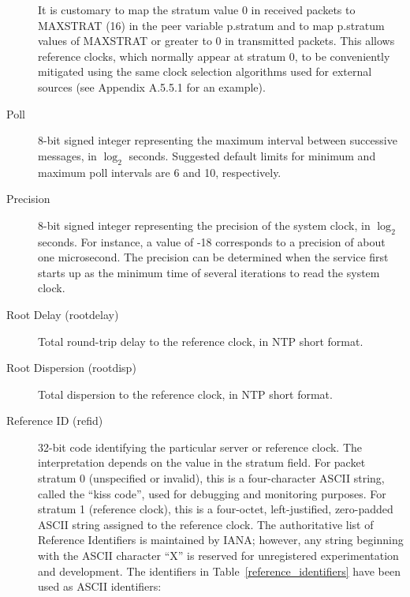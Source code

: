 \begin{description}
It is customary to map the stratum value 0 in received packets to
MAXSTRAT (16) in the peer variable p.stratum and to map p.stratum
values of MAXSTRAT or greater to 0 in transmitted packets. This
allows reference clocks, which normally appear at stratum 0, to be
conveniently mitigated using the same clock selection algorithms used
for external sources (see Appendix A.5.5.1 for an example).

\item[Poll] 8-bit signed integer representing the maximum interval between
successive messages, in $ \log_2 $ seconds. Suggested default limits for
minimum and maximum poll intervals are 6 and 10, respectively.

\item[Precision] 8-bit signed integer representing the precision of the
system clock, in $ \log_2 $ seconds. For instance, a value of -18
corresponds to a precision of about one microsecond. The precision
can be determined when the service first starts up as the minimum
time of several iterations to read the system clock.

\item[Root Delay (rootdelay)] Total round-trip delay to the reference
clock, in NTP short format.

\item[Root Dispersion (rootdisp)] Total dispersion to the reference clock,
in NTP short format.

\item[Reference ID (refid)] 32-bit code identifying the particular server
or reference clock. The interpretation depends on the value in the
stratum field. For packet stratum 0 (unspecified or invalid), this
is a four-character ASCII \cite{RFC1345} string, called the ``kiss code'',
used for debugging and monitoring purposes. For stratum 1 (reference
clock), this is a four-octet, left-justified, zero-padded ASCII
string assigned to the reference clock. The authoritative list of
Reference Identifiers is maintained by IANA; however, any string
beginning with the ASCII character ``X'' is reserved for unregistered
experimentation and development. The identifiers in Table~\ref{reference_identifiers} have
been used as ASCII identifiers:


\end{description}
